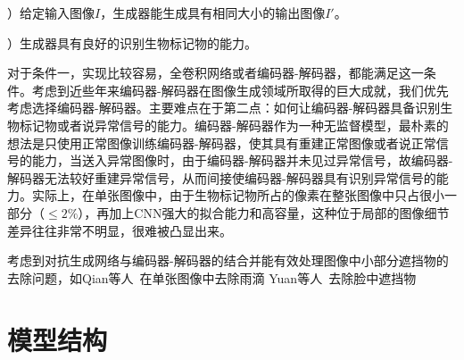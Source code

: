 ）给定输入图像$I$，生成器能生成具有相同大小的输出图像$I'$。

）生成器具有良好的识别生物标记物的能力。

\noindent 对于条件一，实现比较容易，全卷积网络或者编码器-解码器，都能满足这一条件。考虑到近些年来编码器-解码器在图像生成领域所取得的巨大成就，我们优先考虑选择编码器-解码器。主要难点在于第二点：如何让编码器-解码器具备识别生物标记物或者说异常信号的能力。编码器-解码器作为一种无监督模型，最朴素的想法是只使用正常图像训练编码器-解码器，使其具有重建正常图像或者说正常信号的能力，当送入异常图像时，由于编码器-解码器并未见过异常信号，故编码器-解码器无法较好重建异常信号，从而间接使编码器-解码器具有识别异常信号的能力。实际上，在单张图像中，由于生物标记物所占的像素在整张图像中只占很小一部分（$\le 2\%$），再加上CNN强大的拟合能力和高容量，这种位于局部的图像细节差异往往非常不明显，很难被凸显出来。

考虑到对抗生成网络与编码器-解码器的结合并能有效处理图像中小部分遮挡物的去除问题，如Qian等人~\cite{qian2018attentive}在单张图像中去除雨滴 Yuan等人~\cite{yuan2019face}去除脸中遮挡物

\section{模型结构}\label{sec:model_architecture}
